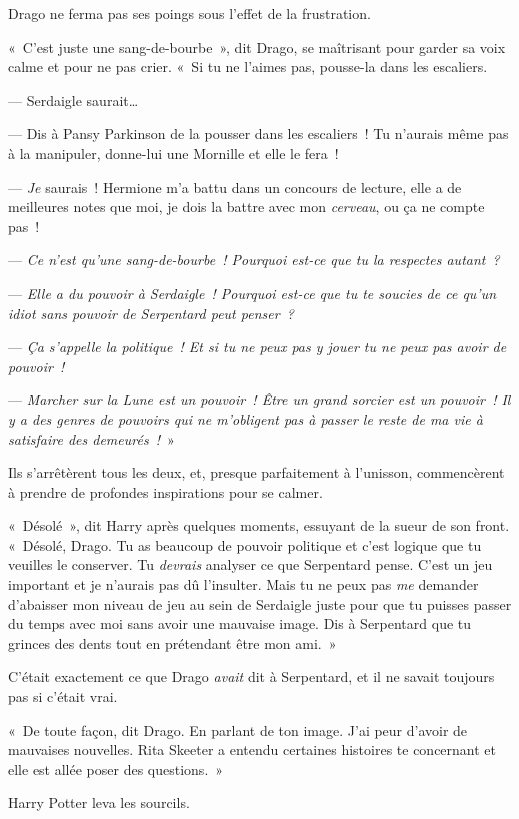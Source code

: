 Drago ne ferma pas ses poings sous l'effet de la frustration.

«~C'est juste une sang-de-bourbe~», dit Drago, se maîtrisant pour garder sa voix calme et pour ne pas crier.
«~Si tu ne l'aimes pas, pousse-la dans les escaliers.

--- Serdaigle saurait…

--- Dis à Pansy Parkinson de la pousser dans les escaliers~!
Tu n'aurais même pas à la manipuler, donne-lui une Mornille et elle le fera~!

--- \emph{Je} saurais~!
Hermione m'a battu dans un concours de lecture, elle a de meilleures notes que moi, je dois la battre avec mon \emph{cerveau}, ou ça ne compte pas~!

--- \emph{Ce n'est qu'une sang-de-bourbe~!
Pourquoi est-ce que tu la respectes autant~?}

--- \emph{Elle a du pouvoir à Serdaigle~!
Pourquoi est-ce que tu te soucies de ce qu'un idiot sans pouvoir de Serpentard peut penser~?}

--- \emph{Ça s'appelle la politique~!
Et si tu ne peux pas y jouer tu ne peux pas avoir de pouvoir~!}

--- \emph{Marcher sur la Lune est un pouvoir~!
Être un grand sorcier est un pouvoir~!
Il y a des genres de pouvoirs qui ne m'obligent pas à passer le reste de ma vie à satisfaire des demeurés~!}~»

Ils s'arrêtèrent tous les deux, et, presque parfaitement à l'unisson, commencèrent à prendre de profondes inspirations pour se calmer.

«~Désolé~», dit Harry après quelques moments, essuyant de la sueur de son front.
«~Désolé, Drago.
Tu as beaucoup de pouvoir politique et c'est logique que tu veuilles le conserver.
Tu \emph{devrais} analyser ce que Serpentard pense.
C'est un jeu important et je n'aurais pas dû l'insulter.
Mais tu ne peux pas \emph{me} demander d'abaisser mon niveau de jeu au sein de Serdaigle juste pour que tu puisses passer du temps avec moi sans avoir une mauvaise image.
Dis à Serpentard que tu grinces des dents tout en prétendant être mon ami.~»

C'était exactement ce que Drago \emph{avait} dit à Serpentard, et il ne savait toujours pas si c'était vrai.

«~De toute façon, dit Drago.
En parlant de ton image.
J'ai peur d'avoir de mauvaises nouvelles.
Rita Skeeter a entendu certaines histoires te concernant et elle est allée poser des questions.~»

Harry Potter leva les sourcils.

